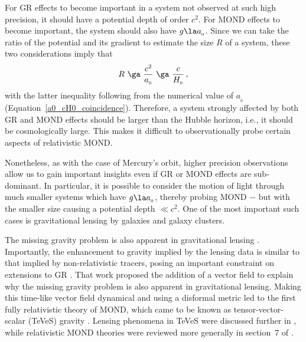 \documentclass[fleqn,usenatbib,useAMS]{mnras} %
\begin{document}
For GR effects to become important in a system not observed at such high precision, it should have a potential depth of order $c^2$. For MOND effects to become important, the system should also have $g \la a_{_0}$. Since we can take the ratio of the potential and its gradient to estimate the size $R$ of a system, these two considerations imply that
\begin{eqnarray}
	R ~\ga~ \frac{c^2}{a_{_0}} ~\ga~ \frac{c}{H_{_0}} \, ,
\end{eqnarray}
with the latter inequality following from the numerical value of $a_{_0}$ (Equation~\ref{a0_cH0_coincidence}). Therefore, a system strongly affected by both GR and MOND effects should be larger than the Hubble horizon, i.e., it should be cosmologically large. This makes it difficult to observationally probe certain aspects of relativistic MOND.

Nonetheless, as with the case of Mercury's orbit, higher precision observations allow us to gain important insights even if GR or MOND effects are sub-dominant. In particular, it is possible to consider the motion of light through much smaller systems which have $g \la a_{_0}$, thereby probing MOND $-$ but with the smaller size causing a potential depth $\ll c^2$. One of the most important such cases is gravitational lensing by galaxies and galaxy clusters.

The missing gravity problem is also apparent in gravitational lensing \citep[section~4.2 of][]{Fort_1994}. Importantly, the enhancement to gravity implied by the lensing data is similar to that implied by non-relativistic tracers, posing an important constraint on extensions to GR \citep{Sanders_1997}. That work proposed the addition of a vector field to explain why the missing gravity problem is also apparent in gravitational lensing. Making this time-like vector field dynamical and using a disformal metric led to the first fully relativistic theory of MOND, which came to be known as tensor-vector-scalar (TeVeS) gravity \citep{Bekenstein_2004}. Lensing phenomena in TeVeS were discussed further in \citet{Zhao_2006_lensing}, while relativistic MOND theories were reviewed more generally in section~7 of \citet{Famaey_McGaugh_2012}.
\end{document}
